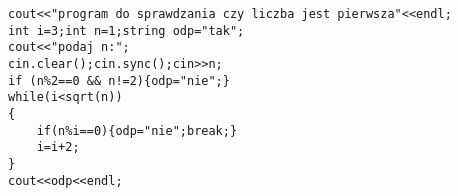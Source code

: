 \begin{verbatim}
cout<<"program do sprawdzania czy liczba jest pierwsza"<<endl;  
int i=3;int n=1;string odp="tak";
cout<<"podaj n:";
cin.clear();cin.sync();cin>>n;
if (n%2==0 && n!=2){odp="nie";}
while(i<sqrt(n))
{
    if(n%i==0){odp="nie";break;}
    i=i+2;
}
cout<<odp<<endl;
\end{verbatim}